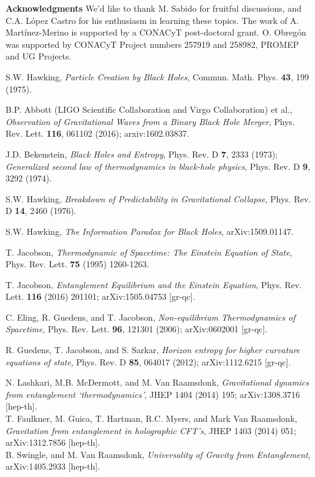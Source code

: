\documentclass[nofootinbib,aps,prd,preprint,groupedaddress,showpacs,showkeys]{revtex4-1}
\begin{document}
{\bf Acknowledgments} We'd like to thank M. Sabido for fruitful discussions, and C.A. L\'opez Castro for his enthusiasm in learning these topics. The work of A. Mart\'inez-Merino is supported by a CONACyT post-doctoral grant. O. Obreg\'on was supported by CONACyT Project numbers 257919 and 258982, PROMEP and UG Projects.



\begin{thebibliography}{99}

 S.W. Hawking, {\it Particle Creation by Black Holes}, Commun. Math. Phys. {\bf 43}, 199 (1975).

 B.P. Abbott (LIGO Scientific Collaboration and Virgo Collaboration) et al., \textit{Observation of Gravitational Waves from a Binary Black Hole Merger}, Phys. Rev. Lett. {\bf 116}, 061102 (2016); arxiv:1602.03837.

 J.D. Bekenstein, {\it Black Holes and Entropy}, Phys. Rev. D {\bf 7}, 2333 (1973); {\it Generalized second law of thermodynamics in black-hole physics}, Phys. Rev. D {\bf 9}, 3292 (1974).

 S.W. Hawking, {\it Breakdown of Predictability in Gravitational Collapse}, Phys. Rev. D {\bf 14}, 2460 (1976).

 S.W. Hawking, {\it The Information Paradox for Black Holes}, arXiv:1509.01147.

 T. Jacobson, {\it Thermodynamic of Spacetime: The Einstein Equation of State}, Phys. Rev. Lett. {\bf 75} (1995) 1260-1263.

 T. Jacobson, \textit{Entanglement Equilibrium and the Einstein Equation}, Phys. Rev. Lett. {\bf 116} (2016) 201101; arXiv:1505.04753 [gr-qc].

 C. Eling, R. Guedens, and T. Jacobson, \textit{Non-equilibrium Thermodynamics of Spacetime}, Phys. Rev. Lett. \textbf{96}, 121301 (2006); arXiv:0602001 [gr-qc].

 R. Guedens, T. Jacobson, and S. Sarkar, \textit{Horizon entropy for higher curvature equations of state}, Phys. Rev. D \textbf{85}, 064017 (2012); arXiv:1112.6215 [gr-qc].

 N. Lashkari, M.B. McDermott, and M. Van Raamsdonk, {\it Gravitational dynamics from entanglement `thermodynamics'}, JHEP 1404 (2014) 195; arXiv:1308.3716 [hep-th].\\
T. Faulkner, M. Guica, T. Hartman, R.C. Myers, and Mark Van Raamsdonk, {\it Gravitation from entanglement in holographic CFT's}, JHEP 1403 (2014) 051; arXiv:1312.7856 [hep-th].\\
B. Swingle, and M. Van Raamsdonk, {\it Universality of Gravity from Entanglement}, arXiv:1405.2933 [hep-th].


\end{thebibliography}
\end{document}
